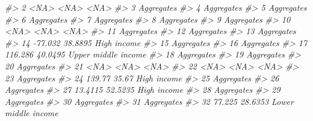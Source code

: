 \documentclass[
  xelatex, ja=standard]{bxjsbook}
\newenvironment{Shaded}{\begin{snugshade}}{\end{snugshade}}
\newcommand{\CommentTok}[1]{\textcolor[rgb]{0.56,0.35,0.01}{\textit{#1}}}
\theoremstyle{definition}
\theoremstyle{definition}
\theoremstyle{definition}
\theoremstyle{definition}
\theoremstyle{remark}
\begin{document}
\begin{Shaded}
\begin{Highlighting}[]
\CommentTok{\#\textgreater{} 2         \textless{}NA\textgreater{}       \textless{}NA\textgreater{}                \textless{}NA\textgreater{}}
\CommentTok{\#\textgreater{} 3                                  Aggregates}
\CommentTok{\#\textgreater{} 4                                  Aggregates}
\CommentTok{\#\textgreater{} 5                                  Aggregates}
\CommentTok{\#\textgreater{} 6                                  Aggregates}
\CommentTok{\#\textgreater{} 7                                  Aggregates}
\CommentTok{\#\textgreater{} 8                                  Aggregates}
\CommentTok{\#\textgreater{} 9                                  Aggregates}
\CommentTok{\#\textgreater{} 10        \textless{}NA\textgreater{}       \textless{}NA\textgreater{}                \textless{}NA\textgreater{}}
\CommentTok{\#\textgreater{} 11                                 Aggregates}
\CommentTok{\#\textgreater{} 12                                 Aggregates}
\CommentTok{\#\textgreater{} 13                                 Aggregates}
\CommentTok{\#\textgreater{} 14     {-}77.032    38.8895         High income}
\CommentTok{\#\textgreater{} 15                                 Aggregates}
\CommentTok{\#\textgreater{} 16                                 Aggregates}
\CommentTok{\#\textgreater{} 17     116.286    40.0495 Upper middle income}
\CommentTok{\#\textgreater{} 18                                 Aggregates}
\CommentTok{\#\textgreater{} 19                                 Aggregates}
\CommentTok{\#\textgreater{} 20                                 Aggregates}
\CommentTok{\#\textgreater{} 21        \textless{}NA\textgreater{}       \textless{}NA\textgreater{}                \textless{}NA\textgreater{}}
\CommentTok{\#\textgreater{} 22        \textless{}NA\textgreater{}       \textless{}NA\textgreater{}                \textless{}NA\textgreater{}}
\CommentTok{\#\textgreater{} 23                                 Aggregates}
\CommentTok{\#\textgreater{} 24      139.77      35.67         High income}
\CommentTok{\#\textgreater{} 25                                 Aggregates}
\CommentTok{\#\textgreater{} 26                                 Aggregates}
\CommentTok{\#\textgreater{} 27     13.4115    52.5235         High income}
\CommentTok{\#\textgreater{} 28                                 Aggregates}
\CommentTok{\#\textgreater{} 29                                 Aggregates}
\CommentTok{\#\textgreater{} 30                                 Aggregates}
\CommentTok{\#\textgreater{} 31                                 Aggregates}
\CommentTok{\#\textgreater{} 32      77.225    28.6353 Lower middle income}

\end{Highlighting}
\end{Shaded}
\end{document}
